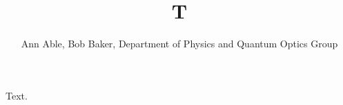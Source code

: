 \documentclass{article}
\begin{document}
\title{T}
\author{Ann Able, Bob Baker, Department of Physics and Quantum Optics Group}
\maketitle
Text.
\end{document}

